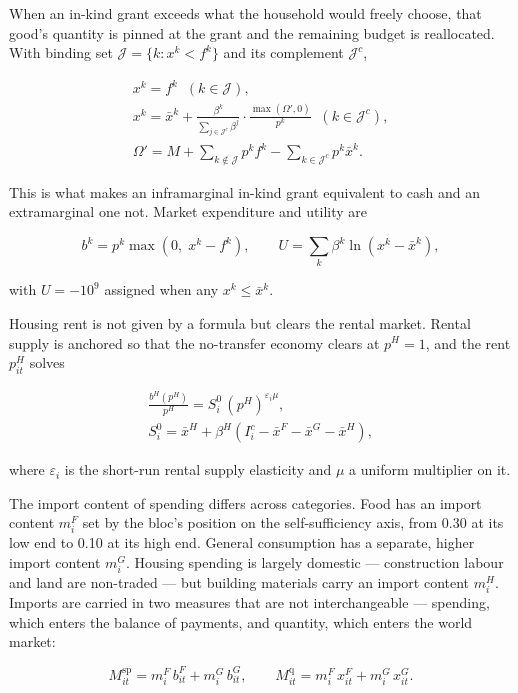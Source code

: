 \documentclass[preprint,review,12pt]{elsarticle}
\begin{document}
When an in-kind grant exceeds what the household would freely choose,
that good's quantity is pinned at the grant and the remaining budget is
reallocated. With binding set \(\mathcal{J} = \{k : x^k < f^k\}\) and
its complement \(\mathcal{J}^c\),

\[\begin{gathered} x^k = f^k \;\; (k \in \mathcal{J}), \\ x^k = \bar{x}^k + \frac{\beta^k}{\sum_{j \in \mathcal{J}^c} \beta^j} \cdot \frac{\max(\Omega', 0)}{p^k} \;\; (k \in \mathcal{J}^c), \\ \Omega' = M + \sum_{k \notin \mathcal{J}} p^k f^k - \sum_{k \in \mathcal{J}^c} p^k \bar{x}^k. \end{gathered} \tag{9}\]

This is what makes an inframarginal in-kind grant equivalent to cash and
an extramarginal one not. Market expenditure and utility are

\[b^k = p^k \max\left(0,\; x^k - f^k\right), \qquad U = \sum_k \beta^k \ln\left(x^k - \bar{x}^k\right), \tag{10}\]

with \(U = -10^9\) assigned when any \(x^k \le \bar{x}^k\).

Housing rent is not given by a formula but clears the rental market.
Rental supply is anchored so that the no-transfer economy clears at
\(p^H = 1\), and the rent \(p^H_{it}\) solves

\[\begin{gathered} \frac{b^H(p^H)}{p^H} = S^0_i \, (p^H)^{\varepsilon_i \mu}, \\ S^0_i = \bar{x}^H + \beta^H \left( I^c_i - \bar{x}^F - \bar{x}^G - \bar{x}^H \right), \end{gathered} \tag{11}\]

where \(\varepsilon_i\) is the short-run rental supply elasticity and
\(\mu\) a uniform multiplier on it.

The import content of spending differs across categories. Food has an
import content \(m^F_i\) set by the bloc's position on the
self-sufficiency axis, from 0.30 at its low end to 0.10 at its high end.
General consumption has a separate, higher import content \(m^G_i\).
Housing spending is largely domestic --- construction labour and land
are non-traded --- but building materials carry an import content
\(m^H_i\). Imports are carried in two measures that are not
interchangeable --- spending, which enters the balance of payments, and
quantity, which enters the world market:

\[M^{\mathrm{sp}}_{it} = m^F_i \, b^F_{it} + m^G_i \, b^G_{it}, \qquad M^{\mathrm{q}}_{it} = m^F_i \, x^F_{it} + m^G_i \, x^G_{it}. \tag{12}\]
\end{document}
